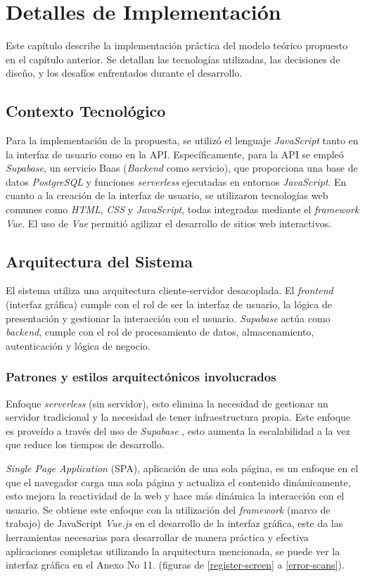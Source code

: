 \chapter{Detalles de Implementación}\label{chapter:implementation}
Este capítulo describe la implementación práctica del modelo teórico propuesto en el capítulo anterior. Se detallan las tecnologías utilizadas, las decisiones de diseño, y los desafíos enfrentados durante el desarrollo.

\section{Contexto Tecnol\'ogico}
Para la implementación de la propuesta, se utilizó el lenguaje \textit{JavaScript} tanto en la interfaz de usuario como en la API. Específicamente, para la API se empleó \textit{Supabase}, un servicio Baas (\textit{Backend} como servicio), que proporciona una base de datos \textit{PostgreSQL} y funciones \textit{serverless} ejecutadas en entornos \textit{JavaScript}. En cuanto a la creación de la interfaz de usuario, se utilizaron tecnologías web comunes como \textit{HTML}, \textit{CSS} y \textit{JavaScript}, todas integradas mediante el \textit{framework} \textit{Vue}. El uso de \textit{Vue} permitió agilizar el desarrollo de sitios web interactivos. 

\section{Arquitectura del Sistema}
El sistema utiliza una arquitectura cliente-servidor desacoplada. El \textit{frontend} (interfaz gr\'afica) cumple con el rol de ser la interfaz de usuario, la l\'ogica de presentaci\'on y gestionar la interacci\'on con el usuario. \textit{Supabase} \cite{supabase} act\'ua como \textit{backend}, cumple con el rol de procesamiento de datos, almacenamiento, autenticaci\'on y l\'ogica de negocio.

\subsection{Patrones y estilos arquitect\'onicos involucrados}
Enfoque \textit{serverless} (sin servidor), esto elimina la necesidad de gestionar un servidor tradicional y la necesidad de tener infraestructura propia. Este enfoque es prove\'ido a trav\'es del uso de \textit{Supabase} \cite{supabase}, esto aumenta la escalabilidad a la vez que reduce los tiempos de desarrollo.

\textit{Single Page Application} (SPA), aplicaci\'on de una sola p\'agina, es un enfoque en el que el navegador carga una sola p\'agina y actualiza el contenido din\'amicamente, esto mejora la reactividad de la web y hace m\'as din\'amica la interacci\'on con el usuario. Se obtiene este enfoque con la utilizaci\'on del \textit{framework} (marco de trabajo) de JavaScript \textit{Vue.js} \cite{vuejs} en el desarrollo de la interfaz gr\'afica, este  da las herramientas necesarias para desarrollar de manera pr\'actica y efectiva aplicaciones completas utilizando la arquitectura mencionada, se puede ver la interfaz gr\'afica en el Anexo No 11. (figuras de \ref{register-screen} a \ref{error-scans}).


